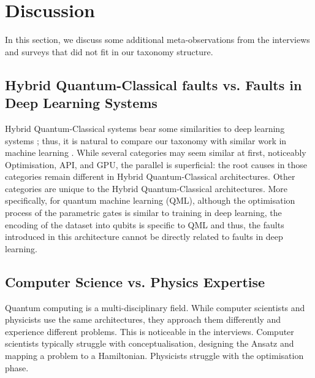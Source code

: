 \section{Discussion}
\label{discussion}
In this section, we discuss some additional meta-observations from the interviews and surveys that did not fit in our taxonomy structure. 

\subsection{Hybrid Quantum-Classical faults vs. Faults in Deep Learning Systems}
Hybrid Quantum-Classical systems bear some similarities to deep learning systems \cite{rieser_tensor_2023}\cite{beer_training_2020}; thus, it  is  natural to compare our taxonomy with similar work in machine learning  \cite{humbatova_taxonomy_2019}. While several categories may seem similar at first, noticeably Optimisation, API, and GPU, the parallel is superficial: the root causes in those categories remain different in Hybrid Quantum-Classical architectures. Other categories are unique to the Hybrid Quantum-Classical architectures.  More specifically, for quantum machine learning (QML), although the optimisation process of the parametric gates is similar to training in deep learning, the encoding of the dataset into qubits is specific to QML and thus, the faults introduced in this architecture cannot be directly related to faults in deep learning.

\subsection{Computer Science vs.  Physics Expertise}
Quantum computing is a multi-disciplinary field. While computer scientists and physicists use the same architectures, they approach them differently  and experience  different problems. This is noticeable in the interviews. Computer scientists typically struggle with conceptualisation, designing the Ansatz and  mapping a problem to a Hamiltonian. Physicists  struggle with the optimisation phase. 

